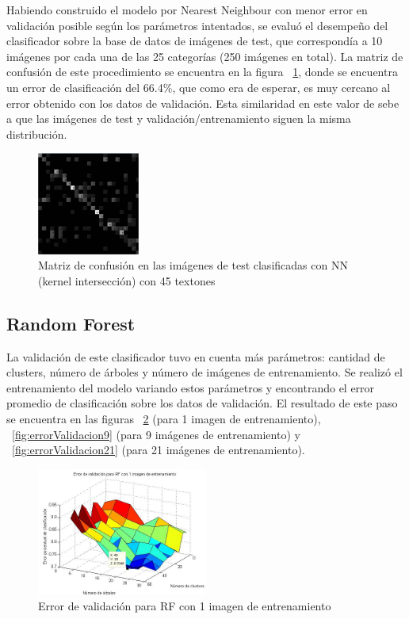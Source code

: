 \documentclass[10pt,twocolumn,letterpaper]{article}
\begin{document}
Habiendo construido el modelo por Nearest Neighbour con menor error en validación posible según los parámetros intentados, se evaluó el desempeño del clasificador sobre la base de datos de imágenes de test, que correspondía a 10 imágenes por cada una de las 25 categorías (250 imágenes en total). La matriz de confusión de este procedimiento se encuentra en la figura ~\ref{fig:confusionTestInterseccion}, donde se encuentra un error de clasificación del 66.4\%, que como era de esperar, es muy cercano al error obtenido con los datos de validación. Esta similaridad en este valor de sebe a que las imágenes de test y validación/entrenamiento siguen la misma distribución.

\begin{figure}[h]
    \centering
    \includegraphics[width=0.3\textwidth]{ConfusionTestInterseccion.jpg}
    \caption{Matriz de confusión en las imágenes de test clasificadas con NN (kernel intersección) con 45 textones}
    \label{fig:confusionTestInterseccion}
\end{figure}

\subsection{Random Forest}
La validación de este clasificador tuvo en cuenta más parámetros: cantidad de clusters, número de árboles y número de imágenes de entrenamiento. Se realizó el entrenamiento del modelo variando estos parámetros y encontrando el error promedio de clasificación sobre los datos de validación. El resultado de este paso se encuentra en las figuras ~\ref{fig:errorValidacion1} (para 1 imagen de entrenamiento), ~\ref{fig:errorValidacion9} (para 9 imágenes de entrenamiento) y  ~\ref{fig:errorValidacion21} (para 21 imágenes de entrenamiento).

\begin{figure}[h]
    \centering
    \includegraphics[width=0.5\textwidth]{ErrorValidacion1.jpg}
    \caption{Error de validación para RF con 1 imagen de entrenamiento}
    \label{fig:errorValidacion1}
\end{figure}
\end{document}
